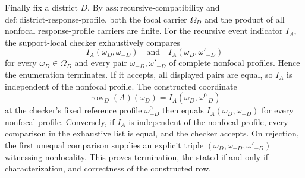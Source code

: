 Finally fix a district \(D\).  By \(\mathrm{ass:recursive\text{-}compatibility}\) and \(\mathrm{def:district\text{-}response\text{-}profile}\), both the focal carrier \(\Omega_D\) and the product of all nonfocal response-profile carriers are finite.  For the recursive event indicator \(I_A\), the support-local checker exhaustively compares
\[
 I_A(\omega_D,\omega_{-D})
 \quad\text{and}\quad
 I_A(\omega_D,\omega'_{-D})
\]
for every \(\omega_D\in\Omega_D\) and every pair \(\omega_{-D},\omega'_{-D}\) of complete nonfocal profiles.  Hence the enumeration terminates.  If it accepts, all displayed pairs are equal, so \(I_A\) is independent of the nonfocal profile.  The constructed coordinate
\[
 \operatorname{row}_D(A)(\omega_D)
 =I_A(\omega_D,\omega^0_{-D})
\]
at the checker's fixed reference profile \(\omega^0_{-D}\) then equals \(I_A(\omega_D,\omega_{-D})\) for every nonfocal profile.  Conversely, if \(I_A\) is independent of the nonfocal profile, every comparison in the exhaustive list is equal, and the checker accepts.  On rejection, the first unequal comparison supplies an explicit triple \((\omega_D,\omega_{-D},\omega'_{-D})\) witnessing nonlocality.  This proves termination, the stated if-and-only-if characterization, and correctness of the constructed row.